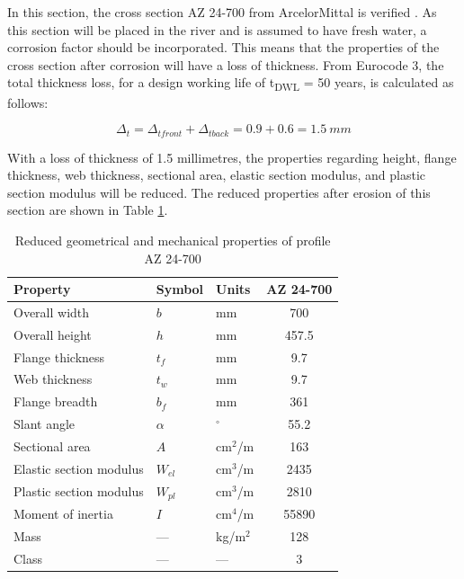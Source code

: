 In this section, the cross section AZ 24-700 from ArcelorMittal is verified \autocite{baxterPilingHandbook2022}. As this section will be placed in the river and is assumed to have fresh water, a corrosion factor should be incorporated. This means that the properties of the cross section after corrosion will have a loss of thickness. From Eurocode 3, the total thickness loss, for a design working life of t\textsubscript{DWL} = 50 years, is calculated as follows:

$$
    \Delta_{t} = \Delta_{tfront} +  \Delta_{tback} = 0.9 + 0.6 = 1.5 \ mm 
$$

With a loss of thickness of 1.5 millimetres, the properties regarding height, flange thickness, web thickness, sectional area, elastic section modulus, and plastic section modulus will be reduced. The reduced properties after erosion of this section are shown in Table \ref{tab:pu32}.


\begin{table}[H]
  \centering
  \small
  \setlength{\tabcolsep}{6pt}
  \renewcommand{\arraystretch}{1.15}
  \caption{Reduced geometrical and mechanical properties of profile AZ 24-700 \autocite{baxterPilingHandbook2022}} 
  \label{tab:pu32}
  \begin{tabular}{@{}l l l c@{}}
    \toprule
    Property & Symbol & Units & AZ 24-700 \\
    \midrule
    Overall width                & $b$     & mm     & 700   \\
    Overall height               & $h$     & mm     & 457.5   \\
    Flange thickness             & $t_f$   & mm     & 9.7  \\
    Web thickness                & $t_w$   & mm     & 9.7  \\
    Flange breadth               & $b_f$   & mm     & 361   \\
    Slant angle                  & $\alpha$ & $^\circ$ & 55.2 \\
    Sectional area               & $A$     & cm$^2$/m & 163 \\
    Elastic section modulus      & $W_{el}$ & cm$^3$/m & 2435 \\
    Plastic section modulus      & $W_{pl}$ & cm$^3$/m & 2810 \\
    Moment of inertia            & $I$     & cm$^4$/m & 55890 \\
    Mass                         & ---     & kg/m$^2$ & 128 \\
    Class    & ---     & ---     & 3 \\
    \bottomrule
  \end{tabular}
\end{table}

